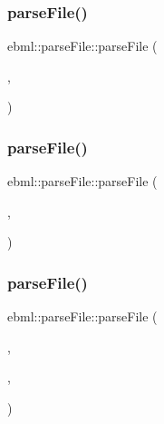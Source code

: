 \mbox{\label{classebml_1_1parseFile_a4284c3ccdc27c8b565ff9ce153d18dfe}} 
\subsubsection{\texorpdfstring{parse\+File()}{parseFile()}\hspace{0.1cm}{\footnotesize\ttfamily [2/10]}}
{\footnotesize\ttfamily ebml\+::parse\+File\+::parse\+File (\begin{DoxyParamCaption}\item[{\mbox{\hyperlink{classebml_1_1ioBase}{io\+Base}} $\ast$}]{,  }\item[{\mbox{\hyperlink{classebml_1_1parseFile}{parse\+File}} \&}]{ }\end{DoxyParamCaption})}

\mbox{\label{classebml_1_1parseFile_a281ce4000db95e3fe7e615bc6f107a19}} 
\subsubsection{\texorpdfstring{parse\+File()}{parseFile()}\hspace{0.1cm}{\footnotesize\ttfamily [3/10]}}
{\footnotesize\ttfamily ebml\+::parse\+File\+::parse\+File (\begin{DoxyParamCaption}\item[{\mbox{\hyperlink{classebml_1_1ioBase}{io\+Base}} $\ast$}]{,  }\item[{off\+\_\+t}]{ }\end{DoxyParamCaption})}

\mbox{\label{classebml_1_1parseFile_a2887fe3092c747e3d394df7000eb453c}} 
\subsubsection{\texorpdfstring{parse\+File()}{parseFile()}\hspace{0.1cm}{\footnotesize\ttfamily [4/10]}}
{\footnotesize\ttfamily ebml\+::parse\+File\+::parse\+File (\begin{DoxyParamCaption}\item[{\mbox{\hyperlink{classebml_1_1ioBase}{io\+Base}} $\ast$}]{,  }\item[{off\+\_\+t}]{,  }\item[{\mbox{\hyperlink{classebml_1_1parseFile}{parse\+File}} \&}]{ }\end{DoxyParamCaption})}

